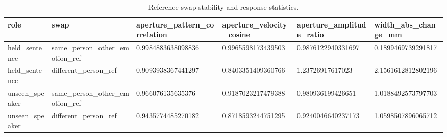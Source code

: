 \begin{table}[t]
\centering
\caption{Reference-swap stability and response statistics.}
\begin{tabular}{llllll}
\toprule
role & swap & aperture\_pattern\_correlation & aperture\_velocity\_cosine & aperture\_amplitude\_ratio & width\_abs\_change\_mm \\
\midrule
held\_sentence & same\_person\_other\_emotion\_ref & 0.9984883638098836 & 0.9965598173439503 & 0.9876122940331697 & 0.1899469739291817 \\
held\_sentence & different\_person\_ref & 0.9093938367441297 & 0.8403351409360766 & 1.23726917617023 & 2.1561612812802196 \\
unseen\_speaker & same\_person\_other\_emotion\_ref & 0.966076135635376 & 0.9187023217479388 & 0.980936199426651 & 1.0188492573797703 \\
unseen\_speaker & different\_person\_ref & 0.9435774485270182 & 0.8718593244751295 & 0.9240046640237173 & 1.0598507896065712 \\
\bottomrule
\end{tabular}
\end{table}
